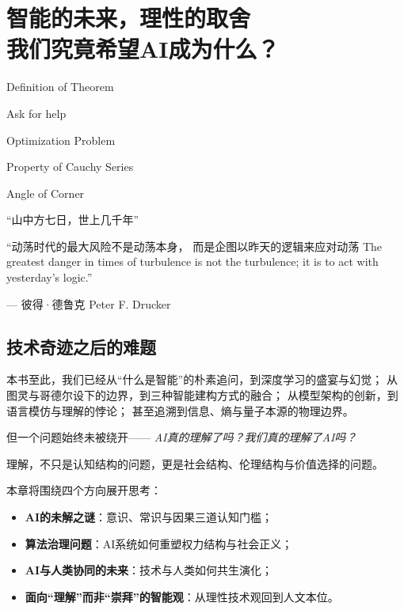 \chapter{智能的未来，理性的取舍\texorpdfstring{\\}{ }我们究竟希望AI成为什么？}

 \begin{introduction}
  \item Definition of Theorem
  \item Ask for help
  \item Optimization Problem
  \item Property of Cauchy Series
  \item Angle of Corner
\end{introduction}

“山中方七日，世上几千年”

“动荡时代的最大风险不是动荡本身， 而是企图以昨天的逻辑来应对动荡
The greatest danger in times of turbulence is not the turbulence; it is to act with yesterday’s logic.”
\begin{flushright}
— 彼得·德鲁克 Peter F. Drucker
\end{flushright}


\section*{技术奇迹之后的难题}

本书至此，我们已经从“什么是智能”的朴素追问，到深度学习的盛宴与幻觉；  
从图灵与哥德尔设下的边界，到三种智能建构方式的融合；  
从模型架构的创新，到语言模仿与理解的悖论；  
甚至追溯到信息、熵与量子本源的物理边界。


但一个问题始终未被绕开—— \textit{AI真的理解了吗？我们真的理解了AI吗？}

理解，不只是认知结构的问题，更是社会结构、伦理结构与价值选择的问题。

本章将围绕四个方向展开思考：

\begin{itemize}
\item \textbf{AI的未解之谜}：意识、常识与因果三道认知门槛；
\item \textbf{算法治理问题}：AI系统如何重塑权力结构与社会正义；
\item \textbf{AI与人类协同的未来}：技术与人类如何共生演化；
\item \textbf{面向“理解”而非“崇拜”的智能观}：从理性技术观回到人文本位。
\end{itemize}



